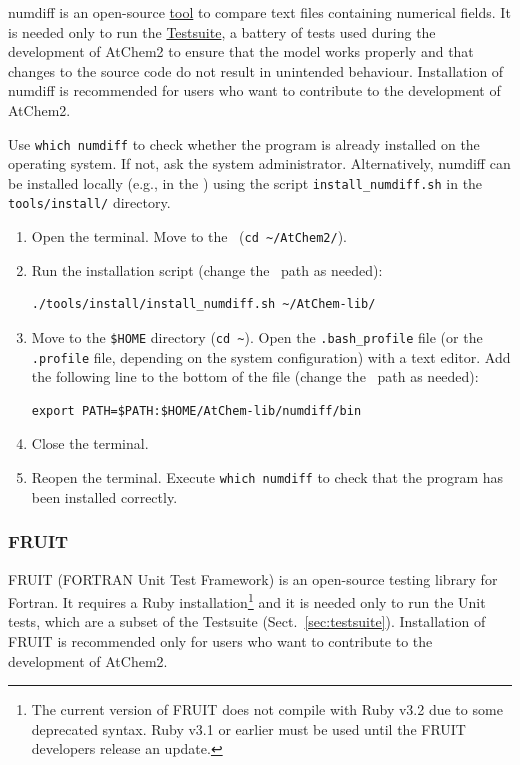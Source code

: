 numdiff is an open-source \href{https://www.nongnu.org/numdiff}{tool} to compare text files
containing numerical fields. It is needed only to run the \hyperref[sec:testsuite]{Testsuite},
a battery of tests used during the development of AtChem2 to ensure that the model works
properly and that changes to the source code do not result in unintended behaviour.
Installation of numdiff is recommended for users who want to contribute to the development of
AtChem2.

Use \verb|which numdiff| to check whether the program is already installed on the operating
system. If not, ask the system administrator. Alternatively, numdiff can be installed locally
(e.g., in the \depdir) using the script \texttt{install\_numdiff.sh} in the
\texttt{tools/install/} directory.

\begin{enumerate}
\item Open the terminal. Move to the \maindir\ (\verb|cd ~/AtChem2/|).
\item Run the installation script (change the \depdir\ path as needed):
  \begin{Verbatim}[fontsize=\small]
  ./tools/install/install_numdiff.sh ~/AtChem-lib/
  \end{Verbatim}
\item Move to the \texttt{\$HOME} directory (\texttt{cd\ \textasciitilde}). Open the
  \texttt{.bash\_profile} file (or the \texttt{.profile} file, depending on the system
  configuration) with a text editor. Add the following line to the bottom of the file (change
  the \depdir\ path as needed):
  \begin{Verbatim}[fontsize=\small]
  export PATH=$PATH:$HOME/AtChem-lib/numdiff/bin
  \end{Verbatim}
\item Close the terminal.
\item Reopen the terminal. Execute \verb|which numdiff| to check that the program has been
  installed correctly.
\end{enumerate}

\subsubsection{FRUIT}

FRUIT (FORTRAN Unit Test Framework) is an open-source testing library for Fortran. It requires
a Ruby installation\footnote{The current version of FRUIT does not compile with Ruby v3.2 due
  to some deprecated syntax. Ruby v3.1 or earlier must be used until the FRUIT developers
  release an update.} and it is needed only to run the Unit tests, which are a subset of the
Testsuite (Sect.~\ref{sec:testsuite}). Installation of FRUIT is recommended only for users who
want to contribute to the development of AtChem2.

